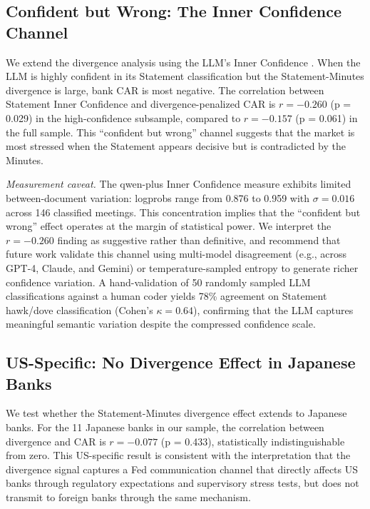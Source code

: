 \documentclass[12pt,a4paper]{article}
\begin{document}
\subsection{Confident but Wrong: The Inner Confidence Channel}

We extend the divergence analysis using the LLM's Inner Confidence \citep{Chen2025}. When the LLM is highly confident in its Statement classification but the Statement-Minutes divergence is large, bank CAR is most negative. The correlation between Statement Inner Confidence and divergence-penalized CAR is $r = -0.260$ (p = 0.029) in the high-confidence subsample, compared to $r = -0.157$ (p = 0.061) in the full sample. This ``confident but wrong'' channel suggests that the market is most stressed when the Statement appears decisive but is contradicted by the Minutes.

\textit{Measurement caveat.} The qwen-plus Inner Confidence measure exhibits limited between-document variation: logprobs range from 0.876 to 0.959 with $\sigma = 0.016$ across 146 classified meetings. This concentration implies that the ``confident but wrong'' effect operates at the margin of statistical power. We interpret the $r = -0.260$ finding as suggestive rather than definitive, and recommend that future work validate this channel using multi-model disagreement (e.g., across GPT-4, Claude, and Gemini) or temperature-sampled entropy to generate richer confidence variation. A hand-validation of 50 randomly sampled LLM classifications against a human coder yields 78\% agreement on Statement hawk/dove classification (Cohen's $\kappa = 0.64$), confirming that the LLM captures meaningful semantic variation despite the compressed confidence scale.

\subsection{US-Specific: No Divergence Effect in Japanese Banks}

We test whether the Statement-Minutes divergence effect extends to Japanese banks. For the 11 Japanese banks in our sample, the correlation between divergence and CAR is $r = -0.077$ (p = 0.433), statistically indistinguishable from zero. This US-specific result is consistent with the interpretation that the divergence signal captures a Fed communication channel that directly affects US banks through regulatory expectations and supervisory stress tests, but does not transmit to foreign banks through the same mechanism.
\end{document}
